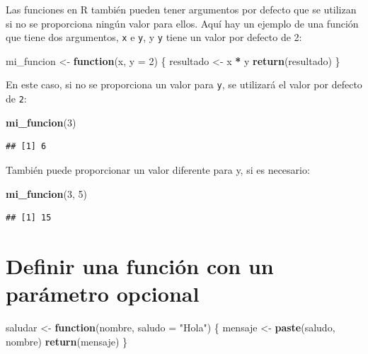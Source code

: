 \documentclass[
]{book}
\newenvironment{Shaded}{\begin{snugshade}}{\end{snugshade}}
\newcommand{\AttributeTok}[1]{\textcolor[rgb]{0.13,0.29,0.53}{#1}}
\newcommand{\ControlFlowTok}[1]{\textcolor[rgb]{0.13,0.29,0.53}{\textbf{#1}}}
\newcommand{\DecValTok}[1]{\textcolor[rgb]{0.00,0.00,0.81}{#1}}
\newcommand{\FunctionTok}[1]{\textcolor[rgb]{0.13,0.29,0.53}{\textbf{#1}}}
\newcommand{\NormalTok}[1]{#1}
\newcommand{\OtherTok}[1]{\textcolor[rgb]{0.56,0.35,0.01}{#1}}
\newcommand{\SpecialCharTok}[1]{\textcolor[rgb]{0.81,0.36,0.00}{\textbf{#1}}}
\newcommand{\StringTok}[1]{\textcolor[rgb]{0.31,0.60,0.02}{#1}}
\begin{document}
Las funciones en R también pueden tener argumentos por defecto que se utilizan si no se proporciona ningún valor para ellos. Aquí hay un ejemplo de una función que tiene dos argumentos, \texttt{x} e \texttt{y}, y \texttt{y} tiene un valor por defecto de 2:

\begin{Shaded}
\begin{Highlighting}[]
\NormalTok{mi\_funcion }\OtherTok{\textless{}{-}} \ControlFlowTok{function}\NormalTok{(x, }\AttributeTok{y =} \DecValTok{2}\NormalTok{) \{}
\NormalTok{  resultado }\OtherTok{\textless{}{-}}\NormalTok{ x }\SpecialCharTok{*}\NormalTok{ y}
  \FunctionTok{return}\NormalTok{(resultado)}
\NormalTok{\}}
\end{Highlighting}
\end{Shaded}

En este caso, si no se proporciona un valor para \texttt{y}, se utilizará el valor por defecto de \texttt{2}:

\begin{Shaded}
\begin{Highlighting}[]
\FunctionTok{mi\_funcion}\NormalTok{(}\DecValTok{3}\NormalTok{)}
\end{Highlighting}
\end{Shaded}

\begin{verbatim}
## [1] 6
\end{verbatim}

También puede proporcionar un valor diferente para y, si es necesario:

\begin{Shaded}
\begin{Highlighting}[]
\FunctionTok{mi\_funcion}\NormalTok{(}\DecValTok{3}\NormalTok{, }\DecValTok{5}\NormalTok{)}
\end{Highlighting}
\end{Shaded}

\begin{verbatim}
## [1] 15
\end{verbatim}

\section{Definir una función con un parámetro opcional}\label{definir-una-funciuxf3n-con-un-paruxe1metro-opcional}

\begin{Shaded}
\begin{Highlighting}[]
\NormalTok{saludar }\OtherTok{\textless{}{-}} \ControlFlowTok{function}\NormalTok{(nombre, }\AttributeTok{saludo =} \StringTok{"Hola"}\NormalTok{) \{}
\NormalTok{  mensaje }\OtherTok{\textless{}{-}} \FunctionTok{paste}\NormalTok{(saludo, nombre)}
  \FunctionTok{return}\NormalTok{(mensaje)}
\NormalTok{\}}
\end{Highlighting}
\end{Shaded}
\end{document}

